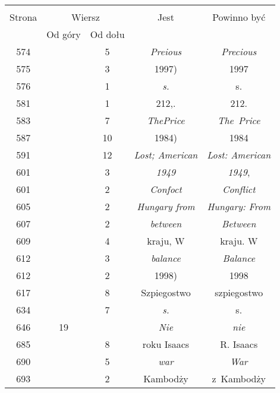 \documentclass[a4paper,11pt]{article}
\begin{document}
\begin{center}
  \begin{tabular}{|c|c|c|c|c|}
    \hline
    & \multicolumn{2}{c|}{} & & \\
    Strona & \multicolumn{2}{c|}{Wiersz} & Jest
                              & Powinno być \\ \cline{2-3}
    & Od góry & Od dołu & & \\
    \hline
    574 & &  5 & \emph{Preious} & \emph{Precious} \\
    575 & &  3 & 1997) & 1997 \\
    576 & &  1 & \emph{s.} & s. \\
    581 & &  1 & 212,. & 212. \\
    583 & &  7 & \emph{ThePrice} & \emph{The~Price} \\
    587 & & 10 & 1984) & 1984 \\
    591 & & 12 & \emph{Lost; American} & \emph{Lost: American} \\
    601 & &  3 & \emph{1949} & \emph{1949}, \\
    601 & &  2 & \emph{Confoct} & \emph{Conflict} \\
    605 & &  2 & \emph{Hungary from} & \emph{Hungary: From} \\
    607 & &  2 & \emph{between} & \emph{Between} \\
    609 & &  4 & kraju, W & kraju. W \\
    612 & &  3 & \emph{balance} & \emph{Balance} \\
    612 & &  2 & 1998) & 1998 \\
    617 & &  8 & Szpiegostwo & szpiegostwo \\
    634 & &  7 & \emph{s.} & s. \\
    646 & 19 & & \emph{Nie} & \emph{nie} \\
    685 & &  8 & roku Isaacs & R. Isaacs \\
    690 & &  5 & \emph{war} & \emph{War} \\
    693 & &  2 & Kambodży & z~Kambodży \\
    \hline
  \end{tabular}


\end{center}
\end{document}
